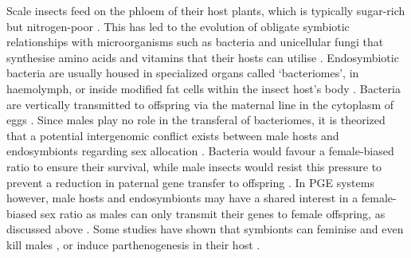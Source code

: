 Scale insects feed on the phloem of their host plants, which is typically sugar-rich but nitrogen-poor \citep{Buchner1965, Douglas2006}. This has led to the evolution of obligate symbiotic relationships with microorganisms such as bacteria and unicellular fungi that synthesise amino acids and vitamins that their hosts can utilise \citep{Buchner1965,Douglas1998, Douglas2006, Douglas2015}. Endosymbiotic bacteria are usually housed in specialized organs called ‘bacteriomes’, in haemolymph, or inside modified fat cells within the insect host’s body \citep{Buchner1965, Normark2004b, Rosenblueth2018}. Bacteria are vertically transmitted to offspring via the maternal line in the cytoplasm of eggs \citep{Buchner1965, Rosenblueth2018}. Since males play no role in the transferal of bacteriomes, it is theorized that a potential intergenomic conflict exists between male hosts and endosymbionts regarding sex allocation \citep{Ross2010GenomicSystems}. Bacteria would favour a female-biased ratio to ensure their survival, while male insects would resist this pressure to prevent a reduction in paternal gene transfer to offspring \citep{Ross2010GenomicSystems}. In PGE systems however, male hosts and endosymbionts may have a shared interest in a female-biased sex ratio as males can only transmit their genes to female offspring, as discussed above \citep{Ross2010GenomicSystems}. Some studies have shown that symbionts can feminise \citep{Rigaud1997} and even kill males \citep{Hurst1991}, or induce parthenogenesis in their host \citep{Stouthamer1990}. 

